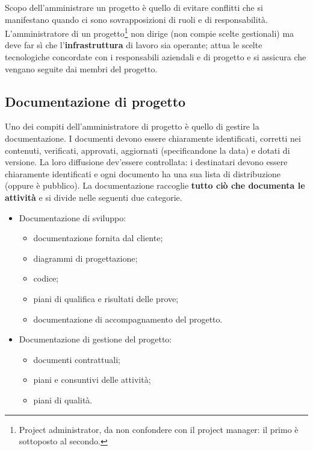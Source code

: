 \documentclass[a4paper]{article}
\begin{document}
		
Scopo dell'amministrare un progetto è quello di evitare conflitti che si manifestano quando ci sono sovrapposizioni di ruoli e di responsabilità. L'amministratore di un progetto\footnote{Project administrator, da non confondere con il project manager: il primo è sottoposto al secondo.} non dirige (non compie scelte gestionali) ma deve far sì che l'\textbf{infrastruttura} di lavoro sia operante; attua le scelte tecnologiche concordate con i responsabili aziendali e di progetto e si assicura che vengano seguite dai membri del progetto.

		
	\subsection{Documentazione di progetto}

		
Uno dei compiti dell'amministratore di progetto è quello di gestire la documentazione. I documenti devono essere chiaramente identificati, corretti nei contenuti, verificati, approvati, aggiornati (specificandone la data) e dotati di versione. La loro diffusione dev'essere controllata: i destinatari devono essere chiaramente identificati e ogni documento ha una sua lista di distribuzione (oppure è pubblico). La documentazione raccoglie \textbf{tutto ciò che documenta le attività} e si divide nelle seguenti due categorie.
		
	\begin{itemize}
		
			
	\item Documentazione di sviluppo:
				
	\begin{itemize}
		
					
	\item documentazione fornita dal cliente;
					
	\item diagrammi di progettazione;
					
	\item codice;
					
	\item piani di qualifica e risultati delle prove;
					
	\item documentazione di accompagnamento del progetto.
				
	\end{itemize}

			
			
	\item Documentazione di gestione del progetto:
				
	\begin{itemize}
		
					
	\item documenti contrattuali;
					
	\item piani e consuntivi delle attività;
					
	\item piani di qualità.
				
	\end{itemize}

			
		
	\end{itemize}
\end{document}
